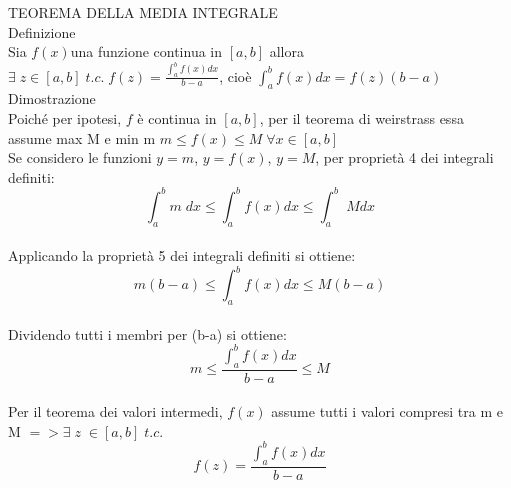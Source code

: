 \documentclass[11pt]{article}
\begin{document}
TEOREMA DELLA MEDIA INTEGRALE\\
Definizione\\
Sia $f(x)$una funzione continua in $[a, b]$ allora $\exists \; z\in [a, b]\; t.c. \;f(z) = \frac{\int_a^b f(x) dx}{b-a}$, cioè ${\int_a^b f(x)dx = f(z)(b-a)}$
\\[10pt]
Dimostrazione\\
Poiché per ipotesi, $f$ è continua in $[a, b]$, per il teorema di weirstrass essa assume max M e min m $m \le f(x) \le M \; \forall x \in [a, b]$ 
\\[10pt]
Se considero le funzioni $y=m$, $y=f(x)$, $y=M$, per proprietà 4 dei integrali definiti:
$$ \int_a^b m \; dx \le \int_a^b f(x) dx \le \int_a^b \; M dx$$
\\[10pt]
Applicando la proprietà 5 dei integrali definiti si ottiene:
$$ m(b-a) \le \int_a^b f(x) dx \le M(b-a)$$
\\[10pt]
Dividendo tutti i membri per (b-a) si ottiene:
$$m \le \frac{\int_a^b f(x) dx}{b-a} \le M $$
\\[10pt]
Per il teorema dei valori intermedi, $f(x)$ assume tutti i valori compresi tra m e M $=> \exists \; z \; \in [a, b] \; t.c.$ 
$$f(z) = \frac{\int_a^b f(x) dx}{b-a}$$
\end{document}
